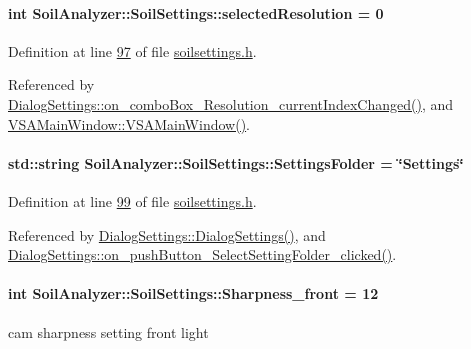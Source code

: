\paragraph[{selected\+Resolution}]{\setlength{\rightskip}{0pt plus 5cm}int Soil\+Analyzer\+::\+Soil\+Settings\+::selected\+Resolution = 0}\label{class_soil_analyzer_1_1_soil_settings_a115a9feb41cc836d28d4ae1ceb536356}


Definition at line \hyperlink{soilsettings_8h_source_l00097}{97} of file \hyperlink{soilsettings_8h_source}{soilsettings.\+h}.



Referenced by \hyperlink{dialogsettings_8cpp_source_l00247}{Dialog\+Settings\+::on\+\_\+combo\+Box\+\_\+\+Resolution\+\_\+current\+Index\+Changed()}, and \hyperlink{vsamainwindow_8cpp_source_l00004}{V\+S\+A\+Main\+Window\+::\+V\+S\+A\+Main\+Window()}.

\hypertarget{class_soil_analyzer_1_1_soil_settings_a2107a9c59b4b04e1edf148c5d5308d17}{}
\paragraph[{Settings\+Folder}]{\setlength{\rightskip}{0pt plus 5cm}std\+::string Soil\+Analyzer\+::\+Soil\+Settings\+::\+Settings\+Folder = \char`\"{}Settings\char`\"{}}\label{class_soil_analyzer_1_1_soil_settings_a2107a9c59b4b04e1edf148c5d5308d17}


Definition at line \hyperlink{soilsettings_8h_source_l00099}{99} of file \hyperlink{soilsettings_8h_source}{soilsettings.\+h}.



Referenced by \hyperlink{dialogsettings_8cpp_source_l00005}{Dialog\+Settings\+::\+Dialog\+Settings()}, and \hyperlink{dialogsettings_8cpp_source_l00476}{Dialog\+Settings\+::on\+\_\+push\+Button\+\_\+\+Select\+Setting\+Folder\+\_\+clicked()}.

\hypertarget{class_soil_analyzer_1_1_soil_settings_a599f28eae821227f5c00aa24b1571b8d}{}
\paragraph[{Sharpness\+\_\+front}]{\setlength{\rightskip}{0pt plus 5cm}int Soil\+Analyzer\+::\+Soil\+Settings\+::\+Sharpness\+\_\+front = 12}\label{class_soil_analyzer_1_1_soil_settings_a599f28eae821227f5c00aa24b1571b8d}
cam sharpness setting front light 

